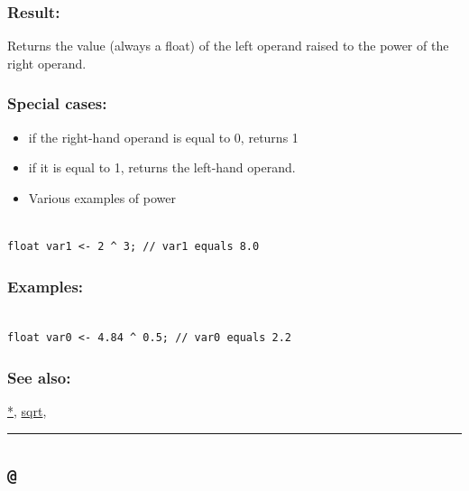 \documentclass[]{book}
\providecommand{\tightlist}{%
  \setlength{\itemsep}{0pt}\setlength{\parskip}{0pt}}
\theoremstyle{definition}
\theoremstyle{definition}
\theoremstyle{definition}
\theoremstyle{remark}
\begin{document}
\subsubsection{Result:}\label{result-7}

Returns the value (always a float) of the left operand raised to the
power of the right operand.

\subsubsection{Special cases:}\label{special-cases-5}

\begin{itemize}
\tightlist
\item
  if the right-hand operand is equal to 0, returns 1\\
\item
  if it is equal to 1, returns the left-hand operand.\\
\item
  Various examples of power
\end{itemize}

\begin{verbatim}
 
float var1 <- 2 ^ 3; // var1 equals 8.0
\end{verbatim}

\subsubsection{Examples:}\label{examples-4}

\begin{verbatim}
 
float var0 <- 4.84 ^ 0.5; // var0 equals 2.2
\end{verbatim}

\subsubsection{See also:}\label{see-also-6}

\href{operators-a-to-a.html\#*}{*},
\href{operators-s-to-z.html\#sqrt}{sqrt},

\begin{center}\rule{0.5\linewidth}{\linethickness}\end{center}

\subsection{\texorpdfstring{\texttt{@}}{@}}\label{section-9}
\end{document}
